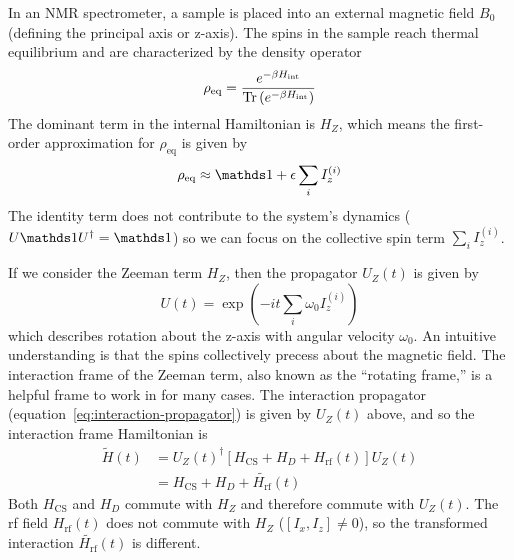 In an NMR spectrometer, a sample is placed into an external magnetic field $B_0$ (defining the principal axis or z-axis). The spins in the sample reach thermal equilibrium and are characterized by the density operator
\[
\rho_{\text{eq}} = \frac{
    e^{-\beta H_{\text{int}}}
    }{
    \text{Tr}\left( 
        e^{-\beta H_{\text{int}}}
      \right)
    }
\]
The dominant term in the internal Hamiltonian is $H_Z$, which means the first-order approximation for $\rho_{\text{eq}}$ is given by
\[
\rho_{\text{eq}} \approx \identity + \epsilon \sum_i I_z^{(i)}
\]
The identity term does not contribute to the system's dynamics ($U \identity U^\dagger = \identity$) so we can focus on the collective spin term $\sum_i I_z^{(i)}$.

If we consider the Zeeman term $H_Z$, then the propagator $U_Z(t)$ is given by
\[
U(t) = \exp \left( -it \sum_i \omega_0 I_z^{(i)} \right)
\]
which describes rotation about the z-axis with angular velocity $\omega_0$. An intuitive understanding is that the spins collectively precess about the magnetic field. The interaction frame of the Zeeman term, also known as the ``rotating frame,'' is a helpful frame to work in for many cases. The interaction propagator (equation~\ref{eq:interaction-propagator}) is given by $U_Z(t)$ above, and so the interaction frame Hamiltonian is
\begin{align*}
    \widetilde{H}(t) &= {U_Z(t)}^{\dagger} \left[ H_\text{CS} + H_D + H_\text{rf}(t) \right] U_Z(t) \\
        &= H_\text{CS} + H_D + \widetilde{H_\text{rf}}(t)
\end{align*}
Both $H_\text{CS}$ and $H_D$ commute with $H_Z$ and therefore commute with $U_Z(t)$. The rf field $H_\text{rf}(t)$ does not commute with $H_Z$ ($[I_x, I_z] \ne 0$), so the transformed interaction $\widetilde{H_\text{rf}}(t)$ is different.


